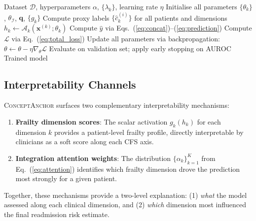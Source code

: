 \documentclass[review,12pt,authoryear]{elsarticle}
\newcommand{\modelname}{\textsc{ConceptAnchor}}
\begin{document}
\begin{algorithm}[t]
  \caption{\modelname{} Training Procedure}
  \label{alg:training}
  \begin{algorithmic}[1]
    \Require Dataset $\mathcal{D}$, hyperparameters $\alpha$, $\{\lambda_k\}$, learning rate $\eta$
    \State Initialise all parameters $\{\theta_k\}$, $\theta_\mathcal{I}$, $\mathbf{q}$, $\{g_k\}$
    \State Compute proxy labels $\{\hat{c}_k^{(i)}\}$ for all patients and dimensions
          \State $h_k \gets \mathcal{A}_k(\mathbf{x}^{(k)}; \theta_k)$ 
        \EndFor
        \State Compute $\hat{y}$ via Eqs.~(\ref{eq:concat})–(\ref{eq:prediction})
        \State Compute $\mathcal{L}$ via Eq.~(\ref{eq:total_loss})
        \State Update all parameters via backpropagation: $\theta \gets \theta - \eta \nabla_\theta \mathcal{L}$
      \EndFor
      \State Evaluate on validation set; apply early stopping on AUROC
    \EndFor
    \State \Return Trained model
  \end{algorithmic}
\end{algorithm}

\subsection{Interpretability Channels}

\modelname{} surfaces two complementary interpretability mechanisms:
\begin{enumerate}[leftmargin=*, label=\arabic*., noitemsep]
  \item \textbf{Frailty dimension scores}: The scalar activation $g_k(h_k)$ for each dimension $k$ provides a patient-level frailty profile, directly interpretable by clinicians as a soft score along each CFS axis.
  \item \textbf{Integration attention weights}: The distribution $\{\alpha_k\}_{k=1}^K$ from Eq.~(\ref{eq:attention}) identifies which frailty dimension drove the prediction most strongly for a given patient.
\end{enumerate}

Together, these mechanisms provide a two-level explanation: (1) \emph{what} the model assessed along each clinical dimension, and (2) \emph{which} dimension most influenced the final readmission risk estimate.

\end{document}
